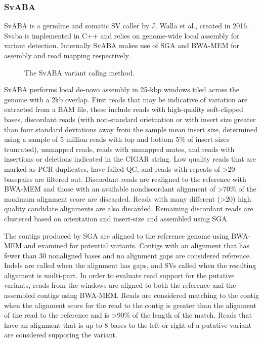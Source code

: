 \subsubsection{SvABA}

SvABA\autocite{wala2018svaba} is a germline and somatic SV caller by J. Walla et al., created in 2016. Svaba is implemented in C++ and relies on genome-wide local assembly for variant detection. Internally SvABA makes use of SGA\autocite{simpson2012efficient} and BWA-MEM\autocite{li2009fast} for assembly and read mapping respectively. 

\begin{figure}[H]
    \centering
    \caption {The SvABA variant callng method\autocite{wala2018svaba}.}
    \label{fig:svaba_method}
\end{figure}

SvABA performs local de-novo assembly in 25-kbp windows tiled across the genome with a 2kb overlap. First reads that may be indicative of variation are extracted from a BAM file, these include reads with high-quality soft-clipped bases, discordant reads (with non-standard orietnation or with insert size greater than four standard deviations away from the sample mean insert size, determined using a sample of 5 million reads with top and bottom 5\% of insert sizes truncated), unmapped reads, reads with unmapped mates, and reads with insertions or deletions indicated in the CIGAR string. Low quality reads that are marked as PCR duplicates, have failed QC, and reads with repeats of >20 basepairs are filtered out. Discordant reads are realigned to the reference with BWA-MEM and those with an available nondiscordant alignment of >70\% of the maximum alignment score are discarded. Reads with many different (>20) high quality candidate alignments are also discarded. Remaining discordant reads are clustered based on orientation and insert-size and assembled using SGA.

The contigs produced by SGA are aligned to the reference genome using BWA-MEM and examined for potential variants. Contigs with an alignment that has fewer than 30 nonaligned bases and no alignment gaps are considered reference. Indels are called when the alignment has gaps, and SVs called when the resulting alignment is multi-part. In order to evaluate read support for the putative variants, reads from the windows are aligned to both the reference and the assembled contigs using BWA-MEM. Reads are considered matching to the contig when the alignment score for the read to the contig is greater than the alignment of the read to the reference and is >90\% of the length of the match. Reads that have an alignment that is up to 8 bases to the left or right of a putative variant are consdered supporing the variant.

